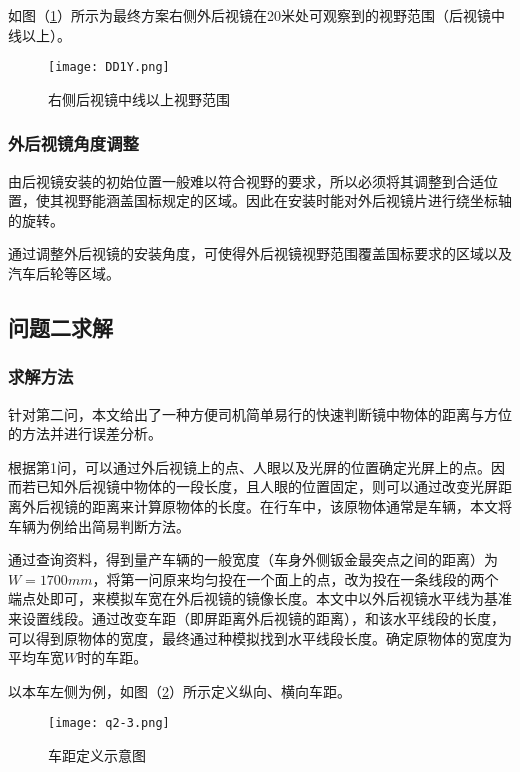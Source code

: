 \documentclass[withoutpreface,bwprint]{cumcmthesis} %
\begin{document}
\par 如图（\ref{fig:DD1Y}）所示为最终方案右侧外后视镜在20米处可观察到的视野范围（后视镜中线以上）。

\begin{figure}[!htbp]
\small
\centering
\texttt{[image: DD1Y.png]}
\caption{右侧后视镜中线以上视野范围} \label{fig:DD1Y}
\end{figure}

 
\subsubsection{外后视镜角度调整}
\par 由后视镜安装的初始位置一般难以符合视野的要求，所以必须将其调整到合适位置，使其视野能涵盖国标规定的区域。因此在安装时能对外后视镜片进行绕坐标轴的旋转。

\par 通过调整外后视镜的安装角度，可使得外后视镜视野范围覆盖国标要求的区域以及汽车后轮等区域。
 
\subsection{问题二求解}
\subsubsection{求解方法}
\par 针对第二问，本文给出了一种方便司机简单易行的快速判断镜中物体的距离与方位的方法并进行误差分析。
\par 根据第1问，可以通过外后视镜上的点、人眼以及光屏的位置确定光屏上的点。因而若已知外后视镜中物体的一段长度，且人眼的位置固定，则可以通过改变光屏距离外后视镜的距离来计算原物体的长度。在行车中，该原物体通常是车辆，本文将车辆为例给出简易判断方法。
\par 通过查询资料，得到量产车辆的一般宽度（车身外侧钣金最突点之间的距离）为$W=1700mm$，将第一问原来均匀投在一个面上的点，改为投在一条线段的两个端点处即可，来模拟车宽在外后视镜的镜像长度。本文中以外后视镜水平线为基准来设置线段。通过改变车距（即屏距离外后视镜的距离），和该水平线段的长度，可以得到原物体的宽度，最终通过种模拟找到水平线段长度。确定原物体的宽度为平均车宽$W$时的车距。

\par 以本车左侧为例，如图（\ref{q2-3}）所示定义纵向、横向车距。

\begin{figure}[!htbp]
\small
\centering
\texttt{[image: q2-3.png]}
\caption{车距定义示意图} \label{q2-3}
\end{figure}
\end{document}
